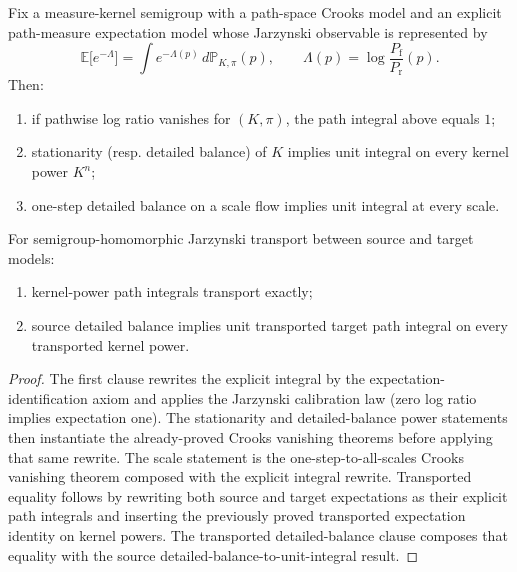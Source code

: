 \begin{theorem}\label{thm:path-measure-jarzynski-integral-transport}
Fix a measure-kernel semigroup with a path-space Crooks model and an explicit path-measure expectation model whose Jarzynski observable is represented by
\[
\mathbb E\bigl[e^{-\Lambda}\bigr]
=
\int e^{-\Lambda(p)}\,d\mathbb P_{K,\pi}(p),
\qquad
\Lambda(p)=\log\frac{P_{\mathrm f}}{P_{\mathrm r}}(p).
\]
Then:
\begin{enumerate}
\item if pathwise log ratio vanishes for $(K,\pi)$, the path integral above equals $1$;
\item stationarity (resp. detailed balance) of $K$ implies unit integral on every kernel power $K^n$;
\item one-step detailed balance on a scale flow implies unit integral at every scale.
\end{enumerate}
For semigroup-homomorphic Jarzynski transport between source and target models:
\begin{enumerate}
\item kernel-power path integrals transport exactly;
\item source detailed balance implies unit transported target path integral on every transported kernel power.
\end{enumerate}
\end{theorem}

\begin{proof}
The first clause rewrites the explicit integral by the expectation-identification axiom and applies the Jarzynski calibration law (zero log ratio implies expectation one). The stationarity and detailed-balance power statements then instantiate the already-proved Crooks vanishing theorems before applying that same rewrite. The scale statement is the one-step-to-all-scales Crooks vanishing theorem composed with the explicit integral rewrite. Transported equality follows by rewriting both source and target expectations as their explicit path integrals and inserting the previously proved transported expectation identity on kernel powers. The transported detailed-balance clause composes that equality with the source detailed-balance-to-unit-integral result.
\end{proof}

